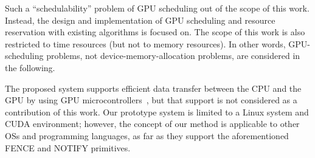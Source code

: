 Such a ``schedulability'' problem of GPU scheduling out of the scope of this work.
Instead, the design and implementation of GPU scheduling and resource reservation with existing algorithms is focused on.
The scope of this work is also restricted to time resources (but not to memory resources).
In other words, GPU-scheduling problems, not device-memory-allocation problems, are considered in the following.

The proposed system supports efficient data transfer between the CPU and the GPU by using GPU microcontrollers~\cite{fujii:icpads2013}, but that support is not considered as a contribution of this work.
Our prototype system is limited to a Linux system and CUDA environment; however, the concept of our method is applicable to other OSs and programming languages, as far as they support the aforementioned FENCE and NOTIFY primitives.
